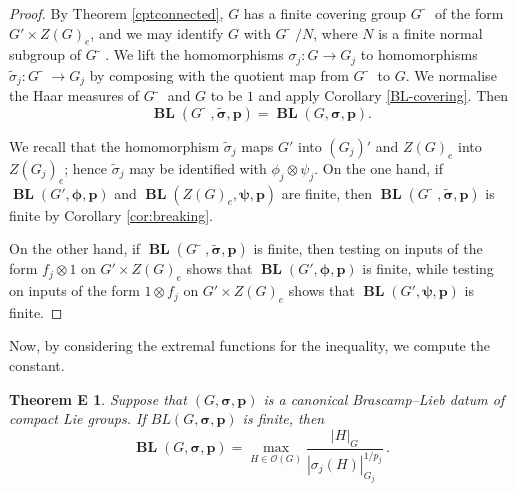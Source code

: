 \documentclass[12pt,twoside,a4paper]{amsart}
\newtheorem*{thmE}{Theorem E}
\theoremstyle{definition}
\theoremstyle{remark}
\numberwithin{equation}{section}
\newcommand{\aftertilde}{\tilde{\phantom{n}}}
\newcommand{\BL}{\operatorname{\mathbf{BL}}}
\newcommand{\bss}{\boldsymbol{\sigma}}
\newcommand{\bsts}{\boldsymbol{\tilde\sigma}}
\newcommand{\bsphi}{\boldsymbol{\phi}}
\newcommand{\bspsi}{\boldsymbol{\psi}}
\newcommand{\bsp}{\boldsymbol{p}}
\begin{document}
\begin{proof}
By Theorem \ref{cptconnected}, $G$ has a finite covering group $G\aftertilde$ of the form $G' \times Z(G)_e$, and we may identify $G$ with ${G\aftertilde }/ N$, where $N$ is a finite normal subgroup of $G\aftertilde$.  
We lift the homomorphisms $\sigma_j\colon  G \to G_j$ to homomorphisms $\tilde\sigma_j\colon  G\aftertilde \to G_j$ by composing with the quotient map from $G\aftertilde$ to $G$.
We normalise the Haar measures of $G\aftertilde$ and $G$ to be $1$ and apply Corollary \ref{BL-covering}. 
Then
\[
\BL(G\aftertilde, \bsts, \bsp) =  \BL(G, \bss, \bsp) .
\]

We recall that the homomorphism $\tilde\sigma_j$ maps $G'$ into $(G_j)'$ and $Z(G)_e$ into $Z(G_j)_e$; hence $\tilde\sigma_j$ may be identified with $\phi_j \otimes \psi_j$.
On the one hand, if $\BL(G', \bsphi,\bsp)$  and $\BL(Z(G)_e, \bspsi,\bsp)$ are finite, then $\BL(G\aftertilde, \bsts, \bsp)$ is finite by Corollary \ref{cor:breaking}.

On the other hand, if $\BL(G\aftertilde, \bsts, \bsp)$ is finite, then testing on inputs of the form $f_j \otimes 1$ on $G' \times Z(G)_e$ shows that $\BL(G', \bsphi,\bsp)$ is finite, while testing on inputs of the form $1 \otimes f_j $ on $G' \times Z(G)_e$ shows that $\BL(G', \bspsi,\bsp)$ is finite.
\end{proof}



Now, by considering the extremal functions for the inequality, we compute the constant.

\begin{thmE}
Suppose that $(G, \bss,\bsp)$ is a canonical Brascamp--Lieb datum of compact Lie groups.
If $BL(G, \bss, \bsp)$ is finite, then
\begin{equation}\label{eq:BL-norm-2}
\BL(G, \bss, \bsp) 
= \max_{H \in \mathcal{O}(G)} \frac{ |H|_G}  {| \sigma_j(H) |_{G_j}^{1/p_j}} \,.
\end{equation}
\end{thmE}
\end{document}
